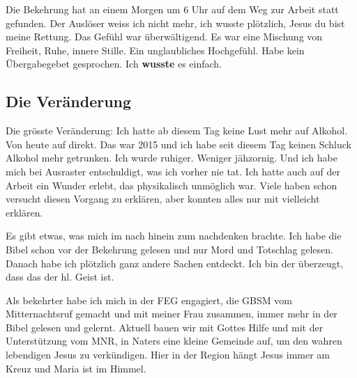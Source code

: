 \documentclass{../../inc/mybib}
\begin{document}
Die Bekehrung hat an einem Morgen um 6 Uhr auf dem Weg zur Arbeit statt gefunden. Der Auslöser weiss ich nicht mehr, ich wusste plötzlich, Jesus du bist meine Rettung. Das Gefühl war überwältigend. Es war eine Mischung von Freiheit, Ruhe, innere Stille. Ein unglaubliches Hochgefühl. Habe kein Übergabegebet gesprochen. Ich \textbf{wusste} es einfach. 
\subsection*{Die Veränderung}
Die grösste Veränderung: Ich hatte ab diesem Tag keine Lust mehr auf Alkohol. Von heute auf direkt. Das war 2015 und ich habe seit diesem Tag keinen Schluck Alkohol mehr getrunken. Ich wurde ruhiger. Weniger jähzornig. Und ich habe mich bei Ausraster entschuldigt, was ich vorher nie tat. Ich hatte auch auf der Arbeit ein Wunder erlebt, das physikalisch unmöglich war. Viele haben schon versucht diesen Vorgang zu erklären, aber konnten alles nur mit vielleicht erklären.

Es gibt etwas, was mich im nach hinein zum nachdenken brachte. Ich habe die Bibel schon vor der Bekehrung gelesen und nur Mord und Totschlag gelesen. Danach habe ich plötzlich ganz andere Sachen entdeckt. Ich bin der überzeugt, dass das der hl. Geist ist.

Als bekehrter habe ich mich in der FEG engagiert, die GBSM vom Mitternachtsruf gemacht und mit meiner Frau zusammen, immer mehr in der Bibel gelesen und gelernt. Aktuell bauen wir mit Gottes Hilfe und mit der Unterstützung vom MNR, in Naters eine kleine Gemeinde auf, um den wahren lebendigen Jesus zu verkündigen. Hier in der Region hängt Jesus immer am Kreuz und Maria ist im Himmel.
\end{document}

